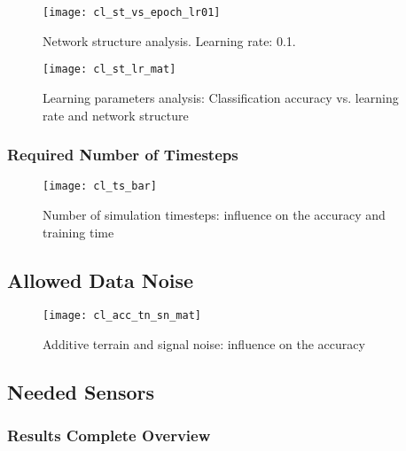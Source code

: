 \begin{figure}[H]
  \centering
  \texttt{[image: cl\_st\_vs\_epoch\_lr01]}
  \caption{Network structure analysis. Learning rate: 0.1.}
  \label{fig:st_analysis}
\end{figure}

\begin{figure}[H]
  \centering
  \texttt{[image: cl\_st\_lr\_mat]}
  \caption{Learning parameters analysis: Classification accuracy vs. learning rate and network structure}
  \label{fig:acc_st_lr_mat}
\end{figure}

\subsubsection{Required Number of Timesteps} \label{sssec:number_of_timesteps}

\begin{figure}[H]
  \centering
  \texttt{[image: cl\_ts\_bar]}
  \caption{Number of simulation timesteps: influence on the accuracy and training time}
  \label{fig:ts_bar}
\end{figure}

\subsection{Allowed Data Noise} \label{ssec:final_configuration}

\begin{figure}[H]
  \centering
  \texttt{[image: cl\_acc\_tn\_sn\_mat]}
  \caption{Additive terrain and signal noise: influence on the accuracy}
  \label{fig:acc_tn_sn_mat}
\end{figure}

\subsection{Needed Sensors} \label{ssec:final_configuration}


\subsubsection{Results Complete Overview} \label{sssec:results_overview}

